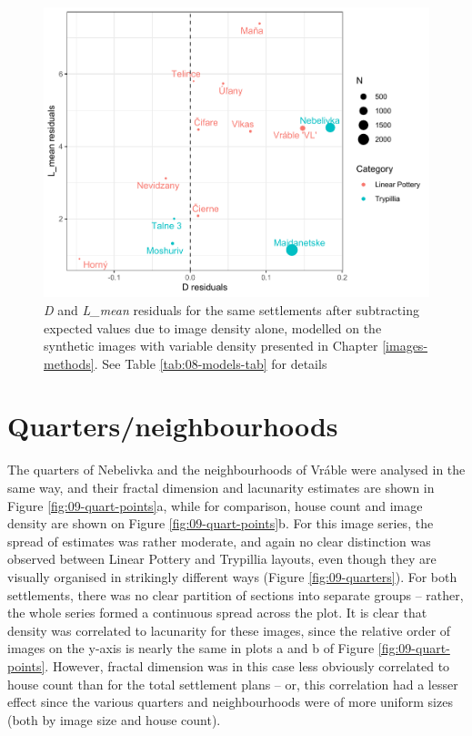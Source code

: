 \documentclass[
  12pt,
  a4paper, twoside]{book}
\begin{document}
\begin{figure}

{\centering \includegraphics[width=0.9\linewidth]{bookdown-demo_files/figure-latex/09-settle-resid-1} 

}

\caption[D and L\_mean residuals, controlled for density, settlements]{\emph{D} and \emph{L\_mean} residuals for the same settlements after subtracting expected values due to image density alone, modelled on the synthetic images with variable density presented in Chapter \ref{images-methods}. See Table \ref{tab:08-models-tab} for details}\label{fig:09-settle-resid}
\end{figure}

\hypertarget{quartersneighbourhoods-1}{%
\section{Quarters/neighbourhoods}\label{quartersneighbourhoods-1}}

The quarters of Nebelivka and the neighbourhoods of Vráble were analysed in the same way, and their fractal dimension and lacunarity estimates are shown in Figure \ref{fig:09-quart-points}a, while for comparison, house count and image density are shown on Figure \ref{fig:09-quart-points}b. For this image series, the spread of estimates was rather moderate, and again no clear distinction was observed between Linear Pottery and Trypillia layouts, even though they are visually organised in strikingly different ways (Figure \ref{fig:09-quarters}). For both settlements, there was no clear partition of sections into separate groups -- rather, the whole series formed a continuous spread across the plot. It is clear that density was correlated to lacunarity for these images, since the relative order of images on the y-axis is nearly the same in plots a and b of Figure \ref{fig:09-quart-points}. However, fractal dimension was in this case less obviously correlated to house count than for the total settlement plans -- or, this correlation had a lesser effect since the various quarters and neighbourhoods were of more uniform sizes (both by image size and house count).
\end{document}
